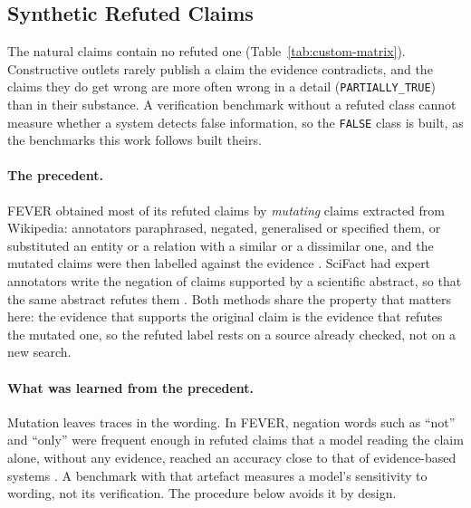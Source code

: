 

\subsection{Synthetic Refuted Claims}
\label{subsec:custom-mutations}

The natural claims contain no refuted one
(Table~\ref{tab:custom-matrix}). Constructive outlets rarely publish a
claim the evidence contradicts, and the claims they do get wrong are
more often wrong in a detail (\texttt{PARTIALLY\_TRUE}) than in their
substance. A verification benchmark without a refuted class cannot
measure whether a system detects false information, so the
\texttt{FALSE} class is built, as the benchmarks this work follows
built theirs.

\paragraph{The precedent.} FEVER obtained most of its refuted claims
by \emph{mutating} claims extracted from Wikipedia: annotators
paraphrased, negated, generalised or specified them, or substituted an
entity or a relation with a similar or a dissimilar one, and the
mutated claims were then labelled against the evidence
\cite{thorne2018fever}. SciFact had expert annotators write the
negation of claims supported by a scientific abstract, so that the same
abstract refutes them \cite{wadden2020scifact}. Both methods share
the property that matters here: the evidence that supports the
original claim is the evidence that refutes the mutated one, so the
refuted label rests on a source already checked, not on a new search.

\paragraph{What was learned from the precedent.} Mutation leaves
traces in the wording. In FEVER, negation words such as ``not'' and
``only'' were frequent enough in refuted claims that a model reading
the claim alone, without any evidence, reached an accuracy close to
that of evidence-based systems \cite{schuster2019debiasing}. A
benchmark with that artefact measures a model's sensitivity to
wording, not its verification. The procedure below avoids it by
design.

